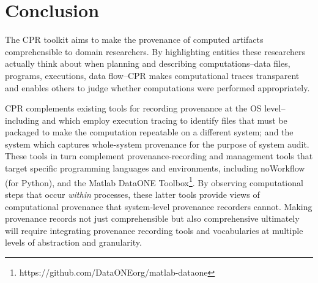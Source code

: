 \section{Conclusion}

The CPR toolkit aims to make the provenance of computed artifacts comprehensible to domain researchers. By highlighting entities these researchers actually think about when planning and describing computations--data files, programs, executions, data flow--CPR makes computational traces transparent and enables others to judge whether computations were performed appropriately.

CPR complements existing tools for recording provenance at the OS level--including  and \cite{that_sciunits_2017} which employ execution tracing to identify files that must be packaged to make the computation repeatable on a different system; and the \cite{pasquier-socc2017} system which captures whole-system provenance for the purpose of system audit. These tools in turn complement provenance-recording and management tools that target specific programming languages and environments, including noWorkflow \cite{pimentel_fine-grained_2016} (for Python), and the Matlab DataONE Toolbox\footnote{https://github.com/DataONEorg/matlab-dataone}. By observing computational steps that occur \emph{within} processes, these latter tools provide views of computational provenance that system-level provenance recorders cannot.  Making provenance records not just comprehensible but also comprehensive ultimately will require integrating provenance recording tools and vocabularies at multiple levels of abstraction and granularity.